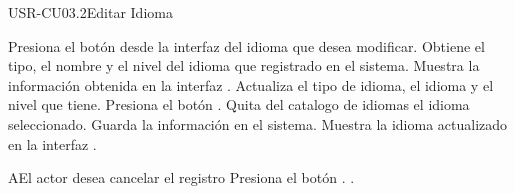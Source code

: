\begin{UseCase}[]{USR-CU03.2}{Editar Idioma}{
}
\end{UseCase}

\begin{UCtrayectoria}
	\UCpaso [\UCactor] Presiona el botón \IUEditar{} desde la interfaz  del idioma que desea modificar.
    \UCpaso [\UCsist] Obtiene el tipo, el nombre y el nivel del idioma que registrado en el sistema.
	\UCpaso [\UCsist] Muestra la información obtenida en la interfaz .
	\UCpaso [\UCactor] Actualiza el tipo de idioma, el idioma y el nivel que tiene.
	\UCpaso [\UCactor] Presiona el botón .
	\UCpaso [\UCsist] Quita del catalogo de idiomas el idioma seleccionado.
	\UCpaso [\UCsist] Guarda la información en el sistema.
	\UCpaso [\UCsist] Muestra la idioma actualizado en la interfaz .
\end{UCtrayectoria}

\begin{UCtrayectoriaA}{A}{El actor desea cancelar el registro}
	\UCpaso [\UCsist] Presiona el botón .
	.
\end{UCtrayectoriaA} 

